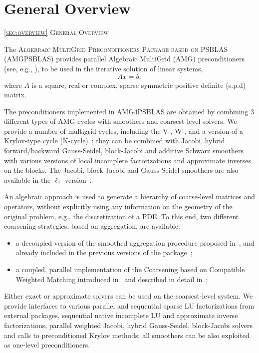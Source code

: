 \section{General Overview\label{sec:overview}}
         {\textsc{\ref{sec:overview} General Overview}}

The \textsc{Algebraic MultiGrid Preconditioners Package based on
PSBLAS} (\textsc{AMG\-PSBLAS}) provides parallel Algebraic
MultiGrid (AMG) preconditioners (see, e.g.,
\cite{Briggs2000,Stuben_01}), 
to be used in the iterative solution of  linear systems,
\begin{equation}
Ax=b,
\label{system1}
\end{equation}
where $A$ is a square, real or complex, sparse symmetric positive definite (s.p.d) matrix.
%
%

The preconditioners implemented in AMG4PSBLAS are obtained by combining
3 different types of AMG cycles with smoothers and coarsest-level
solvers. We provide a number of  multigrid cycles, including the V-,
W-, and a version of a Krylov-type cycle 
(K-cycle)~\cite{Briggs2000,Notay2008}; they can  be
combined with Jacobi, hybrid 
forward/backward Gauss-Seidel, block-Jacobi and additive Schwarz
smoothers with various versions of local incomplete factorizations and
approximate inverses  
on the blocks. The Jacobi, block-Jacobi and
Gauss-Seidel smoothers are also available in the $\ell_1$ version~\cite{DDF2020}.

An algebraic approach is used to generate a hierarchy of
coarse-level matrices and operators, without explicitly using any information on the
geometry of the original problem, e.g., the discretization of a PDE. To this end,
two different coarsening strategies, based on aggregation, are available:
\begin{itemize}
\item a decoupled version of the  smoothed aggregation procedure
  proposed in~\cite{BREZINA_VANEK,VANEK_MANDEL_BREZINA}, and already
  included in the previous versions of the
  package~\cite{aaecc_07,MLD2P4_TOMS}; 
\item a coupled,  parallel implementation of the  Coarsening based on
  Compatible Weighted Matching introduced   in~\cite{DV2013,DFV2018}
  and described in detail in~\cite{DDF2020};  
\end{itemize}
Either exact or approximate solvers can be used on the coarsest-level
system. We provide interfaces to various parallel and sequential
sparse LU factorizations from external  
packages, sequential native incomplete LU and approximate inverse factorizations,
parallel weighted Jacobi, hybrid Gauss-Seidel, block-Jacobi solvers and
calls to preconditioned Krylov methods;  all 
smoothers can be also exploited as one-level preconditioners.

